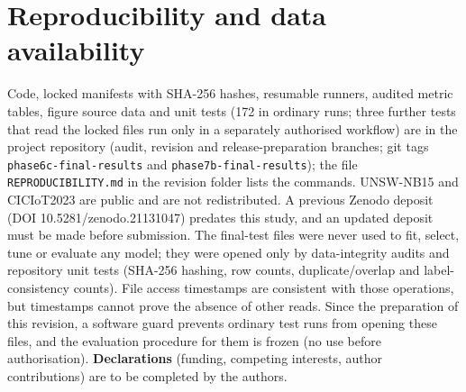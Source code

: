 \documentclass[preprint,12pt,times,numafflabel]{elsarticle}
\begin{document}
\section*{Reproducibility and data availability}
Code, locked manifests with SHA-256 hashes, resumable runners, audited metric tables, figure source data and unit tests (172 in ordinary runs; three further tests that read the locked files run only in a separately authorised workflow) are in the project repository (audit, revision and release-preparation branches; git tags \texttt{phase6c-final-results} and \texttt{phase7b-final-results}); the file \texttt{REPRODUCIBILITY.md} in the revision folder lists the commands. UNSW-NB15 and CICIoT2023 are public and are not redistributed. A previous Zenodo deposit (DOI 10.5281/zenodo.21131047) predates this study, and an updated deposit must be made before submission. The final-test files were never used to fit, select, tune or evaluate any model; they were opened only by data-integrity audits and repository unit tests (SHA-256 hashing, row counts, duplicate/overlap and label-consistency counts). File access timestamps are consistent with those operations, but timestamps cannot prove the absence of other reads. Since the preparation of this revision, a software guard prevents ordinary test runs from opening these files, and the evaluation procedure for them is frozen (no use before authorisation). \textbf{Declarations} (funding, competing interests, author contributions) are to be completed by the authors.

\FloatBarrier


\end{document}

